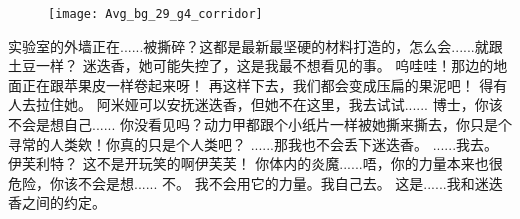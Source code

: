 \documentclass[openany]{book}
\begin{document}
\begin{figure}[h]
    \centering
    \texttt{[image: Avg\_bg\_29\_g4\_corridor]}
\end{figure}
\begin{dialogue}
     实验室的外墙正在......被撕碎？这都是最新最坚硬的材料打造的，怎么会......就跟土豆一样？
     迷迭香，她可能失控了，这是我最不想看见的事。
     呜哇哇！那边的地面正在跟苹果皮一样卷起来呀！
     再这样下去，我们都会变成压扁的果泥吧！
     得有人去拉住她。
     阿米娅可以安抚迷迭香，但她不在这里，我去试试......
     博士，你该不会是想自己......
     你没看见吗？动力甲都跟个小纸片一样被她撕来撕去，你只是个寻常的人类欸！你真的只是个人类吧？
     ......那我也不会丢下迷迭香。
     ......我去。
     伊芙利特？
     这不是开玩笑的啊伊芙芙！
     你体内的炎魔......唔，你的力量本来也很危险，你该不会是想......
     不。
     我不会用它的力量。我自己去。
     这是......我和迷迭香之间的约定。
\end{dialogue}
\end{document}
